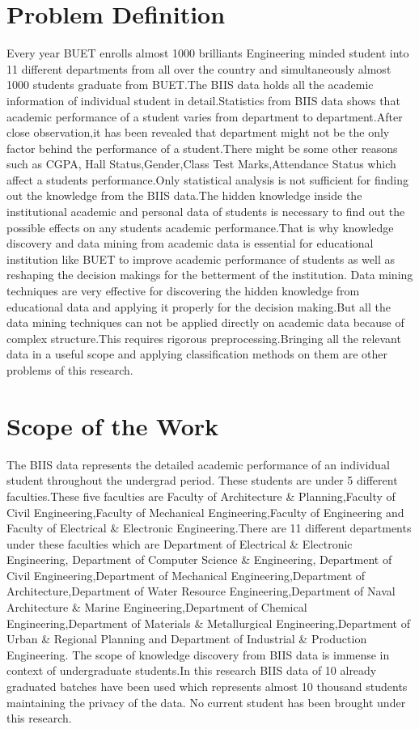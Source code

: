 \section{Problem Definition}
Every year BUET enrolls almost 1000 brilliants Engineering minded student into 11 different departments from all over the country and simultaneously almost 1000 students graduate from BUET.The BIIS data holds all the academic information of individual student in detail.Statistics from BIIS data shows that academic performance of a student varies from department to department.After close observation,it has been revealed that department might not be the only factor behind the performance of a student.There might be some other reasons such as CGPA, Hall Status,Gender,Class Test Marks,Attendance Status which affect a students performance.Only statistical analysis is not sufficient for finding out the knowledge from the BIIS data.The hidden knowledge inside the institutional academic and personal data of students is necessary to find out the possible effects on any students academic performance.That is why knowledge discovery and data mining from academic data is essential for educational institution like BUET to improve academic performance of students as well as reshaping the decision makings for the betterment of the institution.
Data mining techniques are very effective for discovering the hidden knowledge from educational data and applying it properly for the decision making.But all the data mining techniques can not be applied directly on academic data because of complex structure.This requires rigorous preprocessing.Bringing all the relevant data in a useful scope and applying classification methods on them are other problems of this research. 
\section{Scope of the Work}
The BIIS data represents the detailed academic performance of an individual student throughout the undergrad period. These students are under 5 different faculties.These five faculties are Faculty of Architecture \& Planning,Faculty of Civil Engineering,Faculty of Mechanical Engineering,Faculty of Engineering and Faculty of Electrical \& Electronic Engineering.There are 11 different departments under these faculties which are Department of Electrical \& Electronic Engineering, Department of Computer Science \& Engineering, Department of Civil Engineering,Department of Mechanical Engineering,Department of Architecture,Department of Water Resource Engineering,Department of Naval Architecture \& Marine Engineering,Department of Chemical Engineering,Department of Materials \& Metallurgical Engineering,Department of Urban \& Regional Planning and Department of Industrial \& Production Engineering. \cite{buet}
The scope of knowledge discovery from BIIS data is immense in context of undergraduate students.In this research BIIS data of 10 already graduated batches have been used which represents almost 10 thousand students maintaining the privacy of the data. No current student has been brought under this research. 

